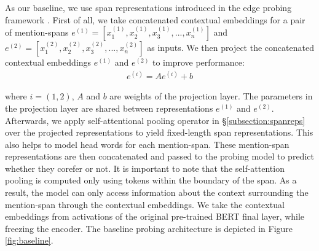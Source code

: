 \documentclass[11pt]{article}
\begin{document}



As our baseline, we use span representations introduced in the edge probing framework \parencite{tenney2019context}. First of all, we take concatenated contextual embeddings for a pair of mention-spans $e^{(1)} = [x_{1}^{(1)}, x_{2}^{(1)}, x_{3}^{(1)}, ..., x_{n}^{(1)}]$ and $e^{(2)} = [x_{1}^{(2)}, x_{2}^{(2)}, x_{3}^{(2)}, ..., x_{n}^{(2)}]$ as inputs. We then project the concatenated contextual embeddings $e^{(1)}$ and $e^{(2)}$ to improve performance:
\begin{align}
e^{(i)} = Ae^{(i)} + b
\end{align}

where $i = (1,2)$, $A$ and $b$ are weights of the projection layer. The parameters in the projection layer are shared between representations $e^{(1)}$ and $e^{(2)}$. Afterwards, we apply self-attentional pooling operator in \S \ref{subsection:spanreps} over the projected representations to yield fixed-length span representations. This also helps to model head words for each mention-span. These mention-span representations are then concatenated and passed to the probing model to predict whether they corefer or not. It is important to note that the self-attention pooling is computed only using tokens within the boundary of the span. As a result, the model can only access information about the context surrounding the mention-span through the contextual embeddings. We take the contextual embeddings from activations of the original pre-trained BERT final layer, while freezing the encoder. The baseline probing architecture is depicted in Figure \ref{fig:baseline}. 
\end{document}
